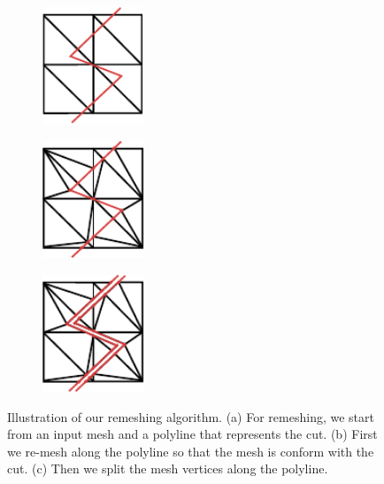 \begin{figure}[p]
\centering
\begin{subfigure}[c]{0.3\linewidth}
\centering
\includegraphics[height=3.5cm]{images/cutting-mig2015/remeshing_1.pdf}
\caption{\label{fig:remeshing1}}
\end{subfigure}
\hfill
\begin{subfigure}[c]{0.3\linewidth}
\centering
\includegraphics[height=3.5cm]{images/cutting-mig2015/remeshing_2.pdf}
\caption{\label{fig:remeshing2}}
\end{subfigure}
\hfill
\begin{subfigure}[c]{0.3\linewidth}
\centering
\includegraphics[height=3.5cm]{images/cutting-mig2015/remeshing_3.pdf}
\caption{\label{fig:remeshing3}}
\end{subfigure}
\caption[Frame-based cutting: Remeshing algorithm]{\label{fig:remeshing} Illustration of our remeshing algorithm. (a) For remeshing, we start from an input mesh and a polyline that represents the cut. (b) First we re-mesh along the polyline so that the mesh is conform with the cut. (c) Then we split the mesh vertices along the polyline.}
\end{figure}

